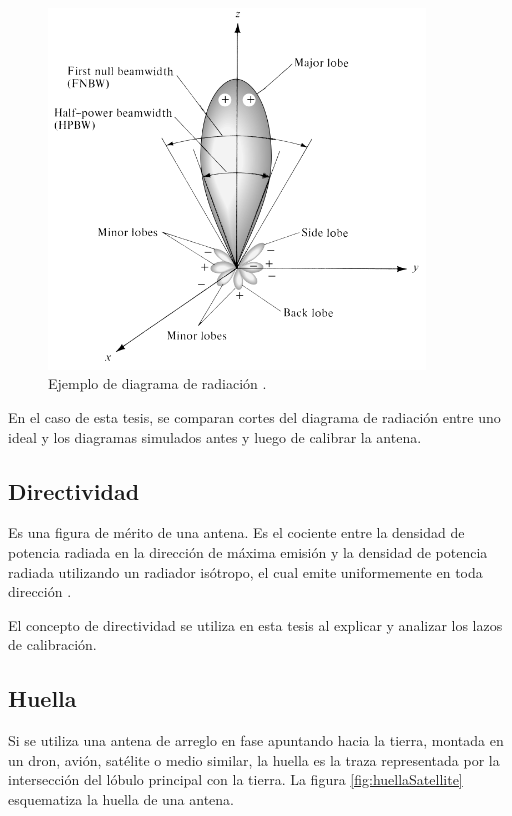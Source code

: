 \begin{figure}[H]
 \centering
 \includegraphics[width=10cm]{gfx/arrayPattern.png}
 \caption{Ejemplo de diagrama de radiación \cite{Balanis2012}.}
\end{figure}

En el caso de esta tesis, se comparan cortes del diagrama de radiación entre uno ideal y los diagramas simulados antes y luego
de calibrar la antena.


\subsection{Directividad} 

Es una figura de mérito de una antena. Es el cociente entre la densidad de potencia radiada en la dirección de máxima emisión
y la densidad de potencia radiada utilizando un radiador isótropo, el cual emite uniformemente en toda dirección
\cite{Standard1996}.

El concepto de directividad se utiliza en esta tesis al explicar y analizar los lazos de calibración.


\subsection{Huella} 

Si se utiliza una antena de arreglo en fase apuntando hacia la tierra, montada en un dron, avión, satélite o medio similar, la
huella es la traza representada por la intersección del lóbulo principal con la tierra. La figura \ref{fig:huellaSatellite}
esquematiza la huella de una antena.

